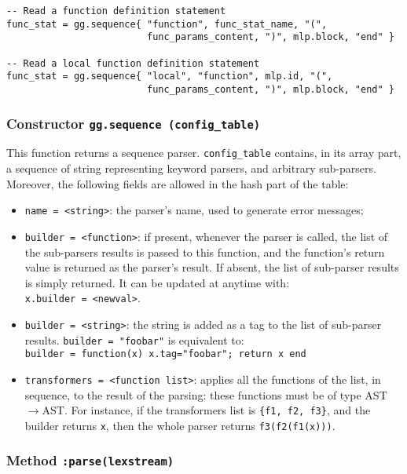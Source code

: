 \begin{Verbatim}[fontsize=\scriptsize]
-- Read a function definition statement
func_stat = gg.sequence{ "function", func_stat_name, "(",
                         func_params_content, ")", mlp.block, "end" }

-- Read a local function definition statement
func_stat = gg.sequence{ "local", "function", mlp.id, "(",
                         func_params_content, ")", mlp.block, "end" }

\end{Verbatim}

\subsubsection{Constructor {\tt gg.sequence (config\_table) }}

This function returns a sequence parser. \verb|config_table| contains,
in its array part, a sequence of string representing keyword parsers,
and arbitrary sub-parsers. Moreover, the following fields are allowed
in the hash part of the table:

\begin{itemize}
\item\verb|name = <string>|: the parser's name, used to generate error
  messages;
\item\verb|builder = <function>|: if present, whenever the parser is
  called, the list of the sub-parsers results is passed to this
  function, and the function's return value is returned as the
  parser's result. If absent, the list of sub-parser results is simply
  returned. It can be updated at anytime with:\\
  \verb|x.builder = <newval>|.
\item\verb|builder = <string>|: the string is added as a tag to the
  list of sub-parser results. \verb|builder = "foobar"| is equivalent
  to:\\
 \verb|builder = function(x) x.tag="foobar"; return x end|
\item\verb|transformers = <function list>|: applies all the functions
  of the list, in sequence, to the result of the parsing: these
  functions must be of type AST$\rightarrow$AST. For instance, if the
  transformers list is {\tt\{f1, f2, f3\}}, and the builder returns
  {\tt x}, then the whole parser returns {\tt f3(f2(f1(x)))}.
\end{itemize}

\subsubsection{Method {\tt :parse(lexstream)}}

